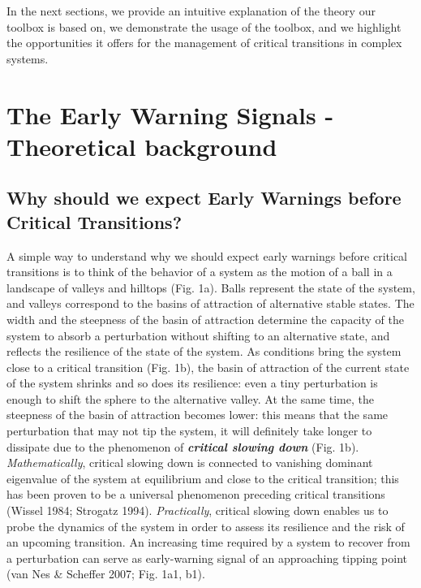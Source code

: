 \documentclass[12pt,a4paper,final]{article}
\begin{document}
In the next sections, we provide an intuitive explanation of the theory our toolbox is based on, we demonstrate the usage of the toolbox, and we highlight the opportunities it offers for the management of critical transitions in complex systems.

\section{The Early Warning Signals - Theoretical background} 

\subsection{Why should we expect Early Warnings before Critical Transitions?}
A simple way to understand why we should expect early warnings before critical transitions is to think of the behavior of a system as the motion of a ball in a landscape of valleys and hilltops (Fig. 1a). Balls represent the state of the system, and valleys correspond to the basins of attraction of alternative stable states. The width and the steepness of the basin of attraction determine the capacity of the system to absorb a perturbation without shifting to an alternative state, and reflects the resilience of the state of the system. As conditions bring the system close to a critical transition (Fig. 1b), the basin of attraction of the current state of the system shrinks and so does its resilience: even a tiny perturbation is enough to shift the sphere to the alternative valley. At the same time, the steepness of the basin of attraction becomes lower: this means that the same perturbation that may not tip the system, it will definitely take longer to dissipate due to the phenomenon of \textit{\textbf{critical slowing down}} (Fig. 1b). \textit{Mathematically}, critical slowing down is connected to vanishing dominant eigenvalue of the system at equilibrium and close to the critical transition; this has been proven to be a universal phenomenon preceding critical transitions (Wissel 1984; Strogatz 1994). \textit{Practically}, critical slowing down enables us to probe the dynamics of the system in order to assess its resilience and the risk of an upcoming transition. An increasing time required by a system to recover from a perturbation can serve as early-warning signal of an approaching tipping point (van Nes \& Scheffer 2007; Fig. 1a1, b1).
\end{document}
